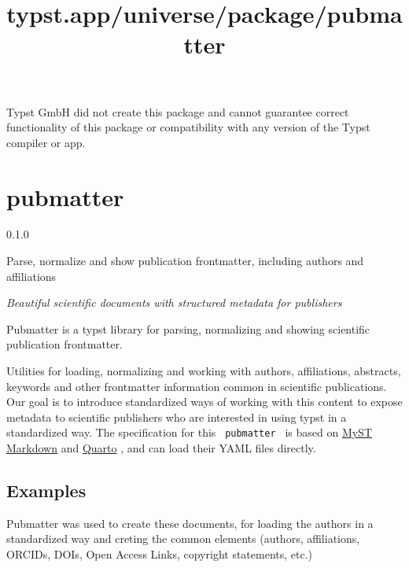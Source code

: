 Typst GmbH did not create this package and cannot guarantee correct
functionality of this package or compatibility with any version of the
Typst compiler or app.


\title{typst.app/universe/package/pubmatter}

\label{banner}
\section{pubmatter}\label{pubmatter}

{ 0.1.0 }

Parse, normalize and show publication frontmatter, including authors and
affiliations

\label{readme}
\emph{Beautiful scientific documents with structured metadata for
publishers}

\href{https://github.com/curvenote/pubmatter/blob/main/docs.pdf}{\pandocbounded{}}
\href{https://github.com/curvenote/pubmatter/blob/main/LICENSE}{\pandocbounded{}}

Pubmatter is a typst library for parsing, normalizing and showing
scientific publication frontmatter.

Utilities for loading, normalizing and working with authors,
affiliations, abstracts, keywords and other frontmatter information
common in scientific publications. Our goal is to introduce standardized
ways of working with this content to expose metadata to scientific
publishers who are interested in using typst in a standardized way. The
specification for this \texttt{\ pubmatter\ } is based on
\href{https://mystmd.org/}{MyST Markdown} and
\href{https://quarto.org/}{Quarto} , and can load their YAML files
directly.

\subsection{Examples}\label{examples}

Pubmatter was used to create these documents, for loading the authors in
a standardized way and creting the common elements (authors,
affiliations, ORCIDs, DOIs, Open Access Links, copyright statements,
etc.)

\pandocbounded{\texttt{[image: https://raw.githubusercontent.com/curvenote/pubmatter/main/images/lapreprint.png?raw=true]}}

